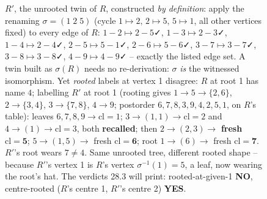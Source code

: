 \begin{figure}[H]
\centering
{}
\caption{\(R'\), the unrooted twin of \(R\), constructed \emph{by definition}:
apply the renaming \(\sigma=(1\;2\;5)\) (cycle \(1\mapsto2,\,2\mapsto5,\,5\mapsto1\), all
other vertices fixed) to every edge of \(R\):
\(1\!-\!2\mapsto2\!-\!5\)✓, \(1\!-\!3\mapsto2\!-\!3\)✓, \(1\!-\!4\mapsto2\!-\!4\)✓,
\(2\!-\!5\mapsto5\!-\!1\)✓, \(2\!-\!6\mapsto5\!-\!6\)✓, \(3\!-\!7\mapsto3\!-\!7\)✓,
\(3\!-\!8\mapsto3\!-\!8\)✓, \(4\!-\!9\mapsto4\!-\!9\)✓ -- exactly the listed edge set.
A twin built as \(\sigma(R)\) needs no re-derivation: \(\sigma\) \emph{is} the
witnessed isomorphism.  Yet \emph{rooted} labels at vertex 1 disagree:
\(R\) at root 1 has name \(4\); labelling \(R'\) at root 1 (rooting gives
\(1\!\to\!5\!\to\!\{2,6\}\), \(2\!\to\!\{3,4\}\), \(3\!\to\!\{7,8\}\),
\(4\!\to\!9\); postorder \(6,7,8,3,9,4,2,5,1\), on \(R\)'s table):
leaves \(6,7,8,9\to\mathrm{cl}=1\); \(3\to(1,1)\to\mathrm{cl}=2\) and
\(4\to(1)\to\mathrm{cl}=3\), both \textbf{recalled}; then
\(2\to(2,3)\to\) \textbf{fresh} \(\mathrm{cl}=\mathbf{5}\);
\(5\to(1,5)\to\) fresh \(\mathrm{cl}=\mathbf{6}\); root
\(1\to(6)\to\) fresh \(\mathrm{cl}=\mathbf{7}\).
\(R'\)'s root wears \(7\ne4\).  Same unrooted tree, different rooted shape --
because \(R'\)'s vertex 1 is \(R\)'s vertex \(\sigma^{-1}(1)=5\), a leaf, now
wearing the root's hat.  The verdicts 28.3 will print: rooted-at-given-1
\textbf{NO}, centre-rooted (\(R\)'s centre 1, \(R'\)'s centre 2) \textbf{YES}.}
\label{fig:c22-twin}
\end{figure}

